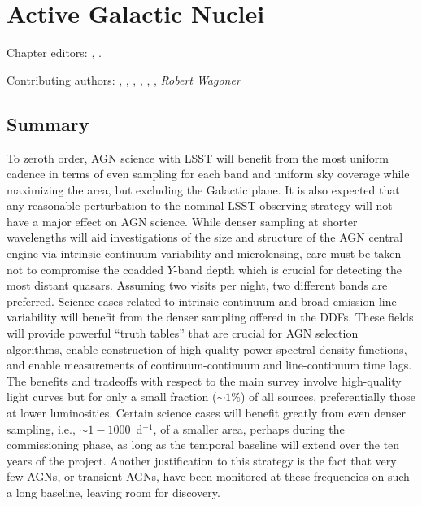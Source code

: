 
\chapter[AGN]{Active Galactic Nuclei}
\def\chpname{agn}\label{chp:\chpname}

Chapter editors:
,
.

Contributing authors:
,
,
,
,
,
,
{\it Robert Wagoner}

\section*{Summary}

To zeroth order, AGN science with LSST will benefit from the most
uniform cadence in terms of even sampling for each band and uniform sky
coverage while maximizing the area, but excluding the Galactic plane. It
is also expected that any reasonable perturbation to the nominal LSST
observing strategy will not have a major effect on AGN science. While
denser sampling at shorter wavelengths will aid investigations of the
size and structure of the AGN central engine via intrinsic continuum
variability and microlensing, care must be taken not to compromise the
coadded $Y$-band depth which is crucial for detecting the most distant
quasars. Assuming two visits per night, two different bands are
preferred. Science cases related to intrinsic continuum and
broad-emission line variability will benefit from the denser sampling
offered in the DDFs. These fields will provide powerful ``truth tables''
that are crucial for AGN selection algorithms, enable construction of
high-quality power spectral density functions, and enable measurements
of continuum-continuum and line-continuum time lags. The benefits and
tradeoffs with respect to the main survey involve high-quality light
curves but for only a small fraction ($\sim1$\%) of all sources,
preferentially those at lower luminosities. Certain science cases will
benefit greatly from even denser sampling, i.e., $\sim1 -
1000$~d$^{-1}$, of a smaller area, perhaps during the commissioning
phase, as long as the temporal baseline will extend over the ten years
of the project. Another justification to this strategy is the fact that
very few AGNs, or transient AGNs, have been monitored at these
frequencies on such a long baseline, leaving room for discovery.

